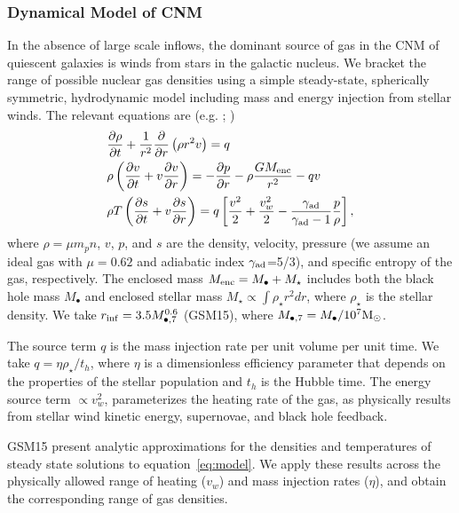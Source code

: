 \documentclass[usenatbib,fleqn]{mnras}
\newcommand{\Mbh}[1][]{M_{\bullet#1}}
\newcommand{\Menc}{M_{\rm enc}}
\newcommand{\Msun}{{\rm M_\odot}}
\begin{document}
\subsubsection{Dynamical Model of CNM}
\label{sec:model}

In the absence of large scale inflows, the dominant source of gas in
the CNM of quiescent galaxies is winds from stars in the galactic
nucleus. We bracket the range of possible nuclear gas densities using
a simple steady-state, spherically symmetric, hydrodynamic model
including mass and energy injection from stellar winds. The relevant
equations are (e.g. \citealt{Holzer+1970}; \citealt{Quataert2004})
\begin{align}
  &\frac{\partial \rho}{\partial t}+\frac{1}{r^2}\frac{\partial}{\partial r}\left(\rho r^2 v\right)=q \label{eq:drhodt}\\
  &\rho \left(\frac{\partial v}{\partial t} + v\frac{\partial
      v}{\partial r}\right) =-\frac{\partial p}{\partial r}- \rho\frac{GM_{\rm enc}}{r^{2}} -q v \label{eq:dvdt}\\
  &\rho T\left(\frac{\partial s}{\partial t} + v\frac{\partial
      s}{\partial
      r}\right)=q\left[\frac{v^2}{2}+\frac{v_w^2}{2}-\frac{\gamma_{\rm
      ad}}{\gamma_{\rm ad}-1}
    \frac{p}{\rho} \right] ,
\label{eq:model}
\end{align}
where $\rho = \mu m_p n$, $v$, $p$, and $s$ are the density, velocity,
pressure (we assume an ideal gas with $\mu = 0.62$ and adiabatic index
$\gamma_{\rm ad}$=5/3), and specific entropy of the gas,
respectively. The enclosed mass $\Menc = M_{\bullet} + M_{\star}$
includes both the black hole mass $M_{\bullet}$ and enclosed stellar
mass $M_{\star} \propto \int \rho_{\star}r^{2}dr$, where
$\rho_{\star}$ is the stellar density. 
 We take $r_{\rm inf}=3.5
\Mbh[,7]^{0.6}$ (GSM15), where $\Mbh[,7]=\Mbh/10^7 \Msun$.

The source term $q$ is the mass injection rate per unit volume per
unit time. We take $q=\eta \rho_{\star}/t_h$, where $\eta$ is a
dimensionless efficiency parameter that depends on the properties of
the stellar population and $t_h$ is the Hubble time. The energy source
term $\propto v_w^{2}$, parameterizes the heating rate of the gas, as
physically results from stellar wind kinetic energy, supernovae, and
black hole feedback.

GSM15 present analytic approximations for the
densities and temperatures of steady state solutions to
equation~\eqref{eq:model}. We apply these results across the
physically allowed range of heating ($v_w$) and mass injection
rates ($\eta$), and obtain the corresponding range of gas densities.
\end{document}
